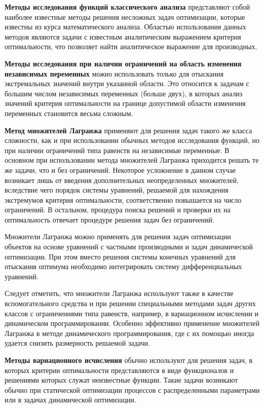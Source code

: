 \textbf{Методы исследования функций классического анализа}
представляют собой наиболее известные методы решения несложных
задач оптимизации, которые известны из курса математического
анализа. Областью использования данных методов являются задачи
с известным аналитическим выражением критерия оптимальности, что
позволяет найти аналитическое выражение для
производных.

\textbf{Методы исследования при наличии ограничений на область изменения
независимых переменных} можно использовать только для отыскания
экстремальных значений внутри указанной области. Это
относится к задачам с большим числом независимых переменных
(больше двух), в которых анализ значений критерия
оптимальности на границе допустимой области изменения переменных
становится весьма сложным.

\textbf{Метод множителей Лагранжа} применяют для решения задач такого
же класса сложности, как и при использовании обычных методов
исследования функций, но при наличии ограничений типа равенств на
независимые переменные. В основном при использовании метода множителей
Лагранжа приходится решать те же задачи, что и без
ограничений. Некоторое усложнение в данном случае возникает лишь от
введения дополнительных неопределенных множителей, вследствие чего
порядок системы уравнений, решаемой для нахождения экстремумов
критерия оптимальности, соответственно повышается на число
ограничений. В остальном, процедура поиска решений и проверки их на
оптимальность отвечает процедуре решения задач без ограничений.

Множители Лагранжа можно применять для решения задач оптимизации
объектов на основе уравнений с частными производными и задач
динамической оптимизации. При этом вместо решения системы конечных
уравнений для отыскания оптимума необходимо интегрировать систему
дифференциальных уравнений.

Следует отметить, что множители Лагранжа используют также в качестве
вспомогательного средства и при решении специальными методами задач
других классов с ограничениями типа равенств, например, в вариационном
исчислении и динамическом программировании. Особенно эффективно
применение множителей Лагранжа в методе динамического
программирования, где с их помощью иногда удается снизить размерность
решаемой задачи.


\textbf{Методы вариационного исчисления} обычно используют для решения задач, в
которых критерии оптимальности представляются в виде функционалов и
решениями которых служат неизвестные функции. Такие задачи возникают
обычно при статической оптимизации процессов с распределенными
параметрами или в задачах динамической оптимизации.

